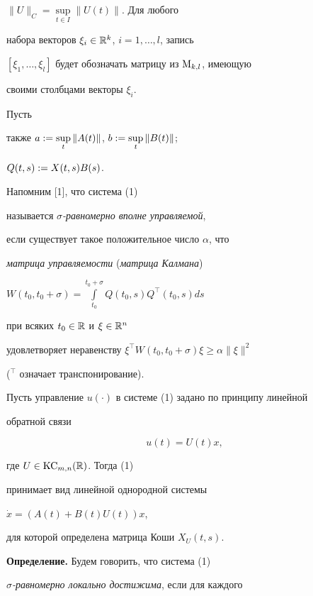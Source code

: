 $\|U\|_C=\sup\limits_{t\in I}\|U(t)\|$. Для любого


набора векторов $\xi_i\in\Bbb R^k$, $i=1,\dotsc,l$, запись


$[\xi_1,\dotsc,\xi_l]$ будет обозначать матрицу из $\mathrm M_{k,l}$, имеющую


своими столбцами векторы $\xi_i$.


Пусть


также $a:=\sup\limits_t\|A(t)\|$, $b:=\sup\limits_t\|B(t)\|$;


$Q(t,s):= X(t,s)B(s)$.





Напомним [1], что система (1)


называется {\it $\sigma$-равномерно вполне управляемой},


если существует такое положительное число $\alpha$, что


{\it матрица управляемости} ({\it матрица Калмана})


$W(t_0,t_0+\sigma)=


\int\limits_{t_0}^{t_0+\sigma}Q(t_0,s)Q^\top(t_0,s)ds$


при всяких $t_0\in\Bbb R$ и $\xi\in\Bbb R^n$


удовлетворяет неравенству $\xi^\top W(t_0,t_0+\sigma)\xi\ge\alpha\|\xi\|^2$


(${}^\top$ означает транспонирование).





Пусть управление $u(\cdot)$ в системе (1) задано по принципу линейной


обратной связи


\begin{equation}


u(t)=U(t)x,


\end{equation}


где $U\in\mathrm{KC}_{m,n}(\Bbb R)$. Тогда (1)


принимает вид линейной однородной системы


$\Dot x=(A(t)+B(t)U(t))x$,


для которой определена матрица Коши $X_U(t,s)$.


\medskip





{\bf Определение.} Будем говорить, что система (1)


{\it $\sigma$-равномерно локально достижима}, если для каждого


